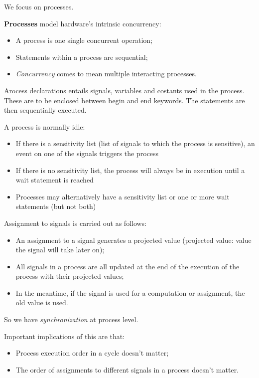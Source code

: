 \documentclass[a4paper,11pt]{article}
\begin{document}
We focus on processes.

\par\smallskip

\textbf{\textsf{Processes}} model hardware’s intrinsic concurrency:
\begin{itemize}
	\item A process is one single concurrent operation;
	\item Statements within a process are sequential;
	\item \textit{Concurrency} comes to mean multiple interacting processes.
\end{itemize}

Arocess declarations entails signals, variables and costants used in the process.
These are to be enclosed between begin and end keywords.
The statements are then sequentially executed.

A process is normally idle:
\begin{itemize}
	\item If there is a sensitivity list (list of signals to which the process is sensitive), an event on one of the signals triggers the process
	\item If there is no sensitivity list, the process will always be in execution until a wait statement is reached
	\item Processes may alternatively have a sensitivity list or one or more wait statements (but not both)
\end{itemize}

Assignment to signals is carried out as follows:
\begin{itemize}
	\item An assignment to a signal generates a projected value (projected value: value the signal will take later on);
	\item All signals in a process are all updated at the end of the execution of the process with their projected values;
	\item In the meantime, if the signal is used for a computation or assignment, the old value is used.
\end{itemize}
So we have \textit{synchronization} at process level.

Important implications of this are that:
\begin{itemize}
	\item Process execution order in a cycle doesn't matter;
	\item The order of assignments to different signals in a process doesn't matter.
\end{itemize}
\end{document}

